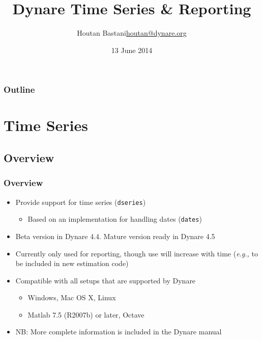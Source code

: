 \documentclass[10pt]{beamer}
\title{Dynare Time Series \& Reporting}
\author[Houtan Bastani]{Houtan Bastani\newline\href{mailto:houtan@dynare.org}{houtan@dynare.org}}
\institute{CEPREMAP}
\date{13 June 2014}
\newcommand{\myitem}{\item[$\bullet$]}
\begin{document}
\begin{frame}
  \titlepage
\end{frame}

\begin{frame}[t]
  \frametitle{Outline}
  \tableofcontents
\end{frame}

%
%
\section{Time Series}

\subsection{Overview}
\begin{frame}[fragile,t]
  \frametitle{Overview}
  \begin{itemize}
  \myitem Provide support for time series (\texttt{dseries})
    \begin{itemize}
    \myitem Based on an implementation for handling dates (\texttt{dates})
    \end{itemize}
  \myitem Beta version in Dynare 4.4. Mature version ready in Dynare 4.5
  \myitem Currently only used for reporting, though use will increase with time
    (\textit{e.g.,} to be included in new estimation code)
  \myitem Compatible with all setups that are supported by Dynare
    \begin{itemize}
    \myitem Windows, Mac OS X, Linux
    \myitem Matlab 7.5 (R2007b) or later, Octave
    \end{itemize}
  \myitem NB: More complete information is included in the Dynare manual
  \end{itemize}
\end{frame}
\end{document}
